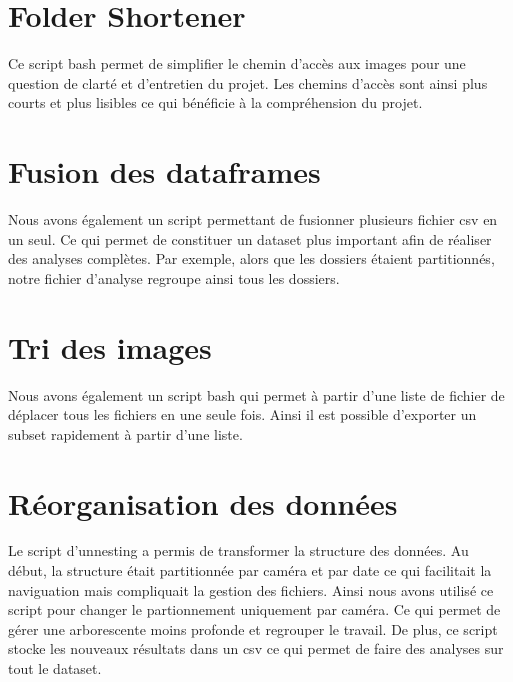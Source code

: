 \section{Folder Shortener}

Ce script bash permet de simplifier le chemin d'accès aux images pour une question de clarté et d'entretien du projet. Les chemins d'accès sont ainsi plus courts et plus lisibles ce qui bénéficie à la compréhension du projet.

\section{Fusion des dataframes}

Nous avons également un script permettant de fusionner plusieurs fichier csv en un seul. Ce qui permet de constituer un dataset plus important afin de réaliser des analyses complètes. Par exemple, alors que les dossiers étaient partitionnés, notre fichier d'analyse regroupe ainsi tous les dossiers.

\section{Tri des images}

Nous avons également un script bash qui permet à partir d'une liste de fichier de déplacer tous les fichiers en une seule fois. Ainsi il est possible d'exporter un subset rapidement à partir d'une liste.

\section{Réorganisation des données}

Le script d'unnesting a permis de transformer la structure des données. Au début, la structure était partitionnée par caméra et par date ce qui facilitait la naviguation mais compliquait la gestion des fichiers. Ainsi nous avons utilisé ce script pour changer le partionnement uniquement par caméra. Ce qui permet de gérer une arborescente moins profonde et regrouper le travail. De plus, ce script stocke les nouveaux résultats dans un csv ce qui permet de faire des analyses sur tout le dataset.
